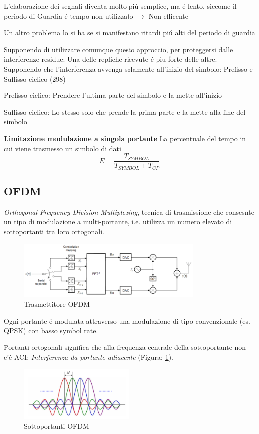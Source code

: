 \documentclass{article}
\begin{document}
L'elaborazione dei segnali diventa molto pi\'u semplice, ma \'e lento, siccome il periodo di Guardia \'e tempo non utilizzato $\rightarrow$ Non efficente

Un altro problema lo si ha se si manifestano ritardi pi\'u alti del periodo di guardia


Supponendo di utilizzare comunque questo approccio, per proteggersi dalle interferenze residue: Una delle repliche ricevute \'e piu forte delle altre. Supponendo che l'interferenza avvenga solamente all'inizio del simbolo: Prefisso e Suffisso ciclico (298)

Prefisso ciclico: Prendere l'ultima parte del simbolo e la mette all'inizio

Suffisso ciclico: Lo stesso solo che prende la prima parte e la mette alla fine del simbolo

\textbf{Limitazione modulazione a singola portante}
La percentuale del tempo in cui viene trasmesso un simbolo di dati
\[ E = \frac{T_{SYMBOL}}{T_{SYMBOL} + T_{CP}} \]


\subsection{OFDM}
\textit{Orthogonal Frequency Division Multiplexing}, tecnica di trasmissione che consesnte un tipo di modulazione a multi-portante, i.e. utilizza un numero elevato di sottoportanti tra loro ortogonali.

\begin{figure}[h]
    \includegraphics[width=0.8\textwidth]{img/sdt/ofdm_transmitter}
    \centering
    \caption{Trasmettitore OFDM}
\end{figure}

Ogni portante \'e modulata attraverso una modulazione di tipo convenzionale (es. QPSK) con basso symbol rate.

Portanti ortogonali significa che alla frequenza centrale della sottoportante non c'\'e ACI: \textit{Interferenza da portante adiacente} (Figura: \ref{ofdm-sub}).
\begin{figure}
    \includegraphics[width=0.5\textwidth]{img/sdt/ofdm-subcarriers}
    \centering
    \caption{Sottoportanti OFDM\label{ofdm-sub}}
\end{figure}
\end{document}
